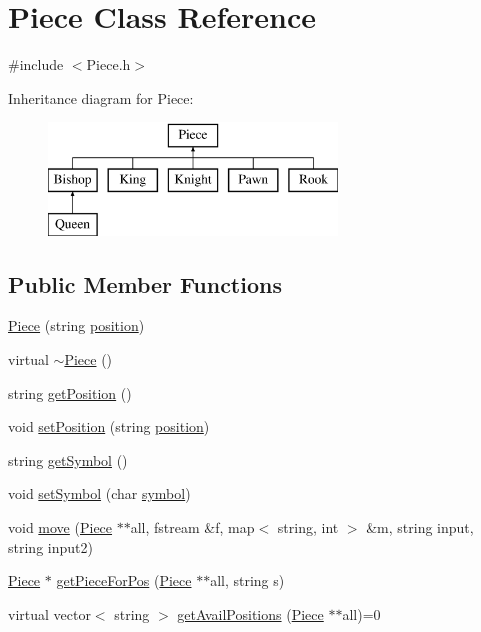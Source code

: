 \hypertarget{class_piece}{}\section{Piece Class Reference}
\label{class_piece}


{\ttfamily \#include $<$Piece.\+h$>$}

Inheritance diagram for Piece\+:\begin{figure}[H]
\begin{center}
\leavevmode
\includegraphics[height=3.000000cm]{class_piece}
\end{center}
\end{figure}
\subsection*{Public Member Functions}
\begin{DoxyCompactItemize}
\item 
\hyperlink{class_piece_a8b0e865b1cfdc0e87ececdd80febfe9a}{Piece} (string \hyperlink{class_piece_a1b93d0ecc14e15fc7f3fb5def518502a}{position})
\item 
virtual \hyperlink{class_piece_a5d7a4f6bade94cb33b6f634de8aa7918}{$\sim$\+Piece} ()
\item 
string \hyperlink{class_piece_a4fa31a8bbea35a6ce0fde5d52d96774b}{get\+Position} ()
\item 
void \hyperlink{class_piece_a64c41f989409d75c48949519aa3e7d38}{set\+Position} (string \hyperlink{class_piece_a1b93d0ecc14e15fc7f3fb5def518502a}{position})
\item 
string \hyperlink{class_piece_a298e07af4a4cb4b8d180e92afd70ffe9}{get\+Symbol} ()
\item 
void \hyperlink{class_piece_ac82f95ec7d998195bdd011a8ee2f3204}{set\+Symbol} (char \hyperlink{class_piece_ab1063e521716374d9a97eddf169be096}{symbol})
\item 
void \hyperlink{class_piece_af60f38fc97d33416b6286d5e74c33778}{move} (\hyperlink{class_piece}{Piece} $\ast$$\ast$all, fstream \&f, map$<$ string, int $>$ \&m, string input, string input2)
\item 
\hyperlink{class_piece}{Piece} $\ast$ \hyperlink{class_piece_acd99f07eb824e56af8e2025d68efafd3}{get\+Piece\+For\+Pos} (\hyperlink{class_piece}{Piece} $\ast$$\ast$all, string s)
\item 
virtual vector$<$ string $>$ \hyperlink{class_piece_a4c717dfd8c910e2088bee2c4c6792c10}{get\+Avail\+Positions} (\hyperlink{class_piece}{Piece} $\ast$$\ast$all)=0
\end{DoxyCompactItemize}
